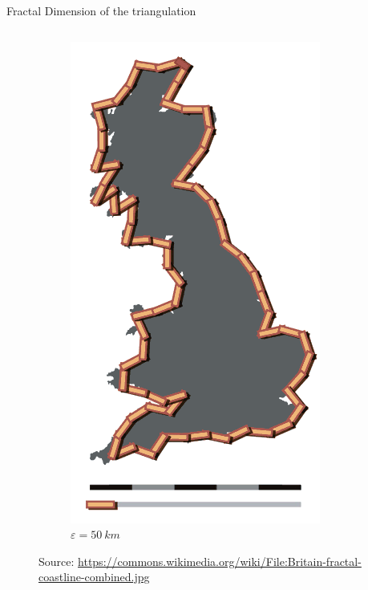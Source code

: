 \begin{frame}{Fractal Dimension of the triangulation}
\begin{columns}
\begin{column}{0.38\textwidth}
\begin{figure}
    \begin{subfigure}{0.32\textwidth}
     \includegraphics[width=\textwidth]{pics/Britain-fractal-coastline-50km}
     \caption{$\varepsilon=\SI{50}{km}$}
    \end{subfigure}
    \caption{\tiny{Source: \url{https://commons.wikimedia.org/wiki/File:Britain-fractal-coastline-combined.jpg}}}

\end{figure}
\end{column}
\end{columns}
\end{frame}
